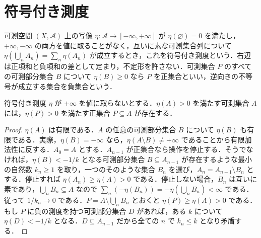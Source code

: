 \section{符号付き測度}
\begin{defn}
可測空間 $(X,\mathcal A)$ 上の写像 $\eta:\mathcal A\to[-\infty,+\infty]$ が $\eta(\varnothing)=0$ を満たし，$+\infty,-\infty$ の両方を値に取ることがなく，互いに素な可測集合列について $\eta(\bigcup_n A_n)=\sum_n\eta(A_n)$ が成立するとき，これを符号付き測度という．右辺は正項和と負項和の差として定まり，不定形を許さない．可測集合 $P$ のすべての可測部分集合 $B$ について $\eta(B)\geq0$ なら $P$ を正集合といい，逆向きの不等号が成立する集合を負集合という．
\end{defn}
\begin{prop}[正集合の抽出]
符号付き測度 $\eta$ が $+\infty$ を値に取らないとする．$\eta(A)>0$ を満たす可測集合 $A$ には，$\eta(P)>0$ を満たす正集合 $P\subseteq A$ が存在する．
\end{prop}
\begin{proof}
$\eta(A)$ は有限である．$A$ の任意の可測部分集合 $B$ について $\eta(B)$ も有限である．実際，$\eta(B)=-\infty$ なら，$\eta(A\setminus B)\ne+\infty$ であることから有限加法性に反する．$A_0=A$ とする．$A_{n-1}$ が正集合なら操作を停止する．そうでなければ，$\eta(B)<-1/k$ となる可測部分集合 $B\subseteq A_{n-1}$ が存在するような最小の自然数 $k_n\geq1$ を取り，一つのそのような集合 $B_n$ を選び，$A_n=A_{n-1}\setminus B_n$ とする．停止すれば $\eta(A_n)\geq\eta(A)>0$ である．停止しない場合，$B_n$ は互いに素であり，$\bigcup_n B_n\subseteq A$ なので $\sum_n(-\eta(B_n))=-\eta(\bigcup_n B_n)<\infty$ である．従って $1/k_n\to0$ である．$P=A\setminus\bigcup_n B_n$ とおくと $\eta(P)\geq\eta(A)>0$ である．もし $P$ に負の測度を持つ可測部分集合 $D$ があれば，ある $k$ について $\eta(D)<-1/k$ となる．$D\subseteq A_{n-1}$ だから全ての $n$ で $k_n\leq k$ となり矛盾する．
\end{proof}
